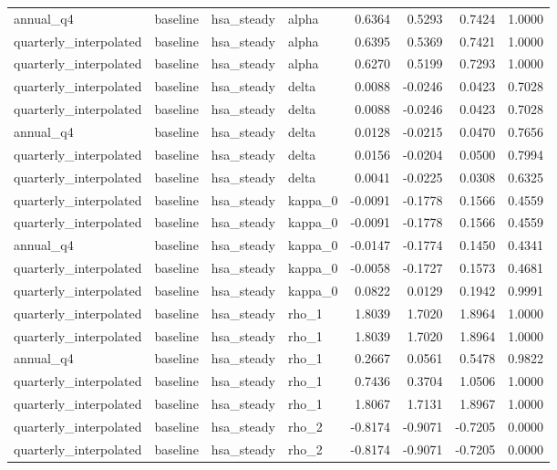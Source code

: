 \begin{tabular}{llllrrrr}
annual\_q4 & baseline & hsa\_steady & alpha & 0.6364 & 0.5293 & 0.7424 & 1.0000 \\
quarterly\_interpolated & baseline & hsa\_steady & alpha & 0.6395 & 0.5369 & 0.7421 & 1.0000 \\
quarterly\_interpolated & baseline & hsa\_steady & alpha & 0.6270 & 0.5199 & 0.7293 & 1.0000 \\
quarterly\_interpolated & baseline & hsa\_steady & delta & 0.0088 & -0.0246 & 0.0423 & 0.7028 \\
quarterly\_interpolated & baseline & hsa\_steady & delta & 0.0088 & -0.0246 & 0.0423 & 0.7028 \\
annual\_q4 & baseline & hsa\_steady & delta & 0.0128 & -0.0215 & 0.0470 & 0.7656 \\
quarterly\_interpolated & baseline & hsa\_steady & delta & 0.0156 & -0.0204 & 0.0500 & 0.7994 \\
quarterly\_interpolated & baseline & hsa\_steady & delta & 0.0041 & -0.0225 & 0.0308 & 0.6325 \\
quarterly\_interpolated & baseline & hsa\_steady & kappa\_0 & -0.0091 & -0.1778 & 0.1566 & 0.4559 \\
quarterly\_interpolated & baseline & hsa\_steady & kappa\_0 & -0.0091 & -0.1778 & 0.1566 & 0.4559 \\
annual\_q4 & baseline & hsa\_steady & kappa\_0 & -0.0147 & -0.1774 & 0.1450 & 0.4341 \\
quarterly\_interpolated & baseline & hsa\_steady & kappa\_0 & -0.0058 & -0.1727 & 0.1573 & 0.4681 \\
quarterly\_interpolated & baseline & hsa\_steady & kappa\_0 & 0.0822 & 0.0129 & 0.1942 & 0.9991 \\
quarterly\_interpolated & baseline & hsa\_steady & rho\_1 & 1.8039 & 1.7020 & 1.8964 & 1.0000 \\
quarterly\_interpolated & baseline & hsa\_steady & rho\_1 & 1.8039 & 1.7020 & 1.8964 & 1.0000 \\
annual\_q4 & baseline & hsa\_steady & rho\_1 & 0.2667 & 0.0561 & 0.5478 & 0.9822 \\
quarterly\_interpolated & baseline & hsa\_steady & rho\_1 & 0.7436 & 0.3704 & 1.0506 & 1.0000 \\
quarterly\_interpolated & baseline & hsa\_steady & rho\_1 & 1.8067 & 1.7131 & 1.8967 & 1.0000 \\
quarterly\_interpolated & baseline & hsa\_steady & rho\_2 & -0.8174 & -0.9071 & -0.7205 & 0.0000 \\
quarterly\_interpolated & baseline & hsa\_steady & rho\_2 & -0.8174 & -0.9071 & -0.7205 & 0.0000 \\

\end{tabular}
